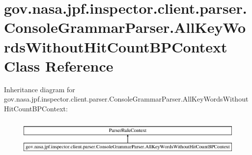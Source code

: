 \hypertarget{classgov_1_1nasa_1_1jpf_1_1inspector_1_1client_1_1parser_1_1_console_grammar_parser_1_1_all_key_4612626c1f72cea22831f9624187dc64}{}\section{gov.\+nasa.\+jpf.\+inspector.\+client.\+parser.\+Console\+Grammar\+Parser.\+All\+Key\+Words\+Without\+Hit\+Count\+B\+P\+Context Class Reference}
\label{classgov_1_1nasa_1_1jpf_1_1inspector_1_1client_1_1parser_1_1_console_grammar_parser_1_1_all_key_4612626c1f72cea22831f9624187dc64}
Inheritance diagram for gov.\+nasa.\+jpf.\+inspector.\+client.\+parser.\+Console\+Grammar\+Parser.\+All\+Key\+Words\+Without\+Hit\+Count\+B\+P\+Context\+:\begin{figure}[H]
\begin{center}
\leavevmode
\includegraphics[height=1.917808cm]{classgov_1_1nasa_1_1jpf_1_1inspector_1_1client_1_1parser_1_1_console_grammar_parser_1_1_all_key_4612626c1f72cea22831f9624187dc64}
\end{center}
\end{figure}
